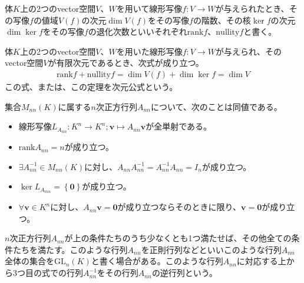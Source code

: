\documentclass[dvipdfmx]{jsarticle}
\begin{document}
\begin{dfn*}
体$K$上の2つのvector空間$V$、$W$を用いて線形写像$f:V \rightarrow W$が与えられたとき、その写像$f$の値域$V(f)$の次元$\dim{V(f)}$をその写像$f$の階数、その核$\ker f$の次元$\dim{\ker f}$をその写像$f$の退化次数といいそれぞれ${\mathrm{rank}}f$、${\mathrm{nullity}}f$と書く。
\end{dfn*}
\begin{thm*}
体$K$上の2つのvector空間$V$、$W$を用いた線形写像$f:V \rightarrow W$が与えられ、そのvector空間$V$が有限次元であるとき、次式が成り立つ。
\begin{align*}
{\mathrm{rank}}f + {\mathrm{nullity}}f = \dim{V(f)} + \dim{\ker f} = \dim V
\end{align*}
この式、または、この定理を次元公式という。
\end{thm*}
\begin{thm*}
集合$M_{nn}(K)$に属する$n$次正方行列$A_{nn}$について、次のことは同値である。
\begin{itemize}
\item
  線形写像$L_{A_{nn}}:K^{n} \rightarrow K^{n};\mathbf{v} \mapsto A_{nn}\mathbf{v}$が全単射である。
\item
  ${\mathrm{rank}}A_{nn} = n$が成り立つ。
\item
  $\exists A_{nn}^{- 1} \in M_{nn}(K)$に対し、$A_{nn}A_{nn}^{- 1} = A_{nn}^{- 1}A_{nn} = I_{n}$が成り立つ。
\item
  $\ker L_{A_{mn}} = \left\{ \mathbf{0} \right\}$が成り立つ。
\item
  $\forall\mathbf{v} \in K^{n}$に対し、$A_{nn}\mathbf{v} = \mathbf{0}$が成り立つならそのときに限り、$\mathbf{v} = \mathbf{0}$が成り立つ。
\end{itemize}
\end{thm*}
\begin{dfn*}
$n$次正方行列$A_{nn}$が上の条件たちのうち少なくとも1つ満たせば、その他全ての条件たちを満たす。このような行列$A_{nn}$を正則行列などといいこのような行列$A_{nn}$全体の集合を${\mathrm{GL}}_{n}(K)$と書く場合がある。このような行列$A_{nn}$に対応する上から3つ目の式での行列$A_{nn}^{- 1}$をその行列$A_{nn}$の逆行列という。
\end{dfn*}
\end{document}
